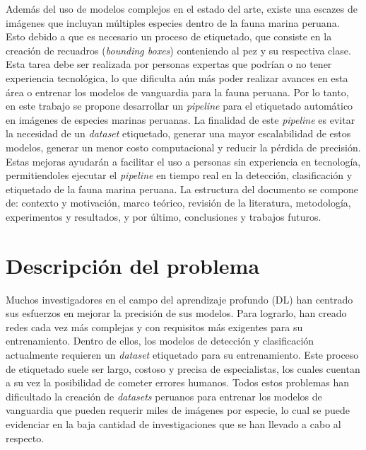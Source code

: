 Además del uso de modelos complejos en el estado del arte, existe una escazes 
de imágenes que incluyan múltiples especies dentro de la fauna marina peruana. 
Esto debido a que es necesario un proceso de etiquetado, que consiste en la creación 
de recuadros (\textit{bounding boxes}) conteniendo al pez y su respectiva clase.
Esta tarea debe ser realizada por personas expertas que podrían o no tener experiencia 
tecnológica, lo que dificulta aún más poder realizar avances en esta área o entrenar 
los modelos de vanguardia para la fauna peruana. 
\newline
\newline
Por lo tanto, en este trabajo se propone desarrollar un \textit{pipeline} 
para el etiquetado automático en imágenes de especies marinas peruanas. 
La finalidad de este \textit{pipeline} es evitar la necesidad de un 
\textit{dataset} etiquetado, generar una mayor escalabilidad de estos 
modelos, generar un menor costo computacional y reducir la pérdida de 
precisión. Estas mejoras ayudarán a facilitar el uso a personas sin experiencia 
en tecnología, permitiendoles ejecutar el \textit{pipeline} en tiempo real 
en la detección, clasificación y etiquetado de la fauna marina peruana. 
\newline
\newline
La estructura del documento se compone de: contexto y motivación, marco 
teórico, revisión de la literatura, metodología, experimentos y resultados, 
y por último, conclusiones y trabajos futuros.


\section{Descripción del problema}

Muchos investigadores en el campo del aprendizaje profundo (DL) 
han centrado sus esfuerzos en mejorar la precisión de sus modelos. Para 
lograrlo, han creado redes cada vez más complejas y con requisitos más 
exigentes para su entrenamiento. Dentro de ellos, los modelos de detección 
y clasificación actualmente requieren un \textit{dataset} etiquetado para su 
entrenamiento. Este proceso de etiquetado suele ser largo, costoso y precisa de  
especialistas, los cuales cuentan a su vez la posibilidad de cometer 
errores humanos. Todos estos problemas han dificultado la creación de 
\textit{datasets} peruanos para entrenar los modelos de vanguardia que pueden 
requerir miles de imágenes por especie, lo cual se puede evidenciar en la 
baja cantidad de investigaciones que se han llevado a cabo al respecto. 

